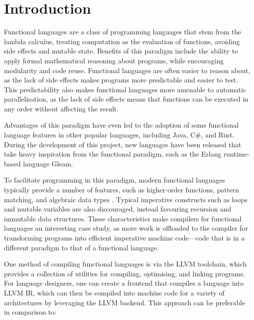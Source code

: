 \chapter{Introduction}

Functional languages are a class of programming languages that stem from the lambda calculus,
treating computation as the evaluation of functions, avoiding side effects and mutable state.
Benefits of this paradigm include the ability to apply formal mathematical reasoning about programs,
while encouraging modularity and code reuse. Functional languages are often easier to reason about,
as the lack of side effects makes programs more predictable and easier to test. This predictability
also makes functional languages more amenable to automatic parallelisation, as the lack of side
effects means that functions can be executed in any order without affecting the result.

Advantages of this paradigm have even led to the adoption of some functional language features in
other popular languages, including Java, C\#, and Rust. During the development of this project, new
languages have been released that take heavy inspiration from the functional paradigm, such as the
Erlang runtime-based language Gleam.

To facilitate programming in this paradigm, modern functional languages typically provide a number
of features, such as higher-order functions, pattern matching, and algebraic data types
\autocite{hudak1989conception}. Typical imperative constructs such as loops and mutable variables
are also discouraged, instead favouring recursion and immutable data structures. These
characteristics make compilers for functional languages an interesting case study, as more work is
offloaded to the compiler for transforming programs into efficient imperative machine code---code
that is in a different paradigm to that of a functional language.

One method of compiling functional languages is via the LLVM toolchain, which provides a collection
of utilities for compiling, optimising, and linking programs. For language designers, one can create
a frontend that compiles a language into LLVM IR, which can then be compiled into machine code for a
variety of architectures by leveraging the LLVM backend. This approach can be preferable in
comparison to:

